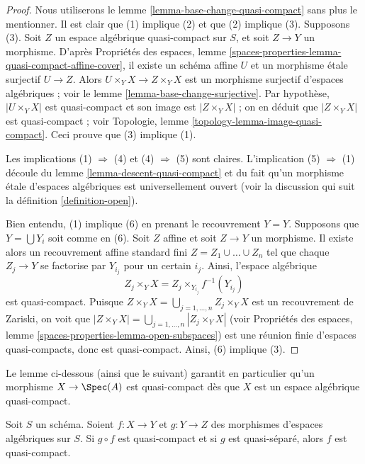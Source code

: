 \begin{proof}
Nous utiliserons le lemme \ref{lemma-base-change-quasi-compact}
sans plus le mentionner.
Il est clair que (1) implique (2) et que (2) implique (3).
Supposons (3). Soit $Z$ un espace algébrique quasi-compact sur $S$,
et soit $Z \to Y$ un morphisme. D'après
Propriétés des espaces, lemme
\ref{spaces-properties-lemma-quasi-compact-affine-cover},
il existe un schéma affine $U$ et un morphisme \'etale surjectif
$U \to Z$. Alors $U \times_Y X \to Z \times_Y X$ est un morphisme
surjectif d'espaces algébriques ; voir le
lemme \ref{lemma-base-change-surjective}.
Par hypothèse, $|U \times_Y X|$ est quasi-compact et son image
est $|Z \times_Y X|$ ; on en déduit que $|Z \times_Y X|$
est quasi-compact ; voir
Topologie, lemme \ref{topology-lemma-image-quasi-compact}.
Ceci prouve que (3) implique (1).

\medskip\noindent
Les implications (1) $\Rightarrow$ (4) et (4) $\Rightarrow$ (5) sont claires.
L'implication (5) $\Rightarrow$ (1) découle du
lemme \ref{lemma-descent-quasi-compact}
et du fait qu'un morphisme \'etale d'espaces algébriques est universellement ouvert
(voir la discussion qui suit la
définition \ref{definition-open}).

\medskip\noindent
Bien entendu, (1) implique (6) en prenant le recouvrement $Y = Y$.
Supposons que $Y = \bigcup Y_i$ soit comme en (6). Soit $Z$ affine et soit
$Z \to Y$ un morphisme. Il existe alors un recouvrement affine standard fini
$Z = Z_1 \cup \ldots \cup Z_n$ tel que chaque $Z_j \to Y$
se factorise par $Y_{i_j}$ pour un certain $i_j$. Ainsi, l'espace algébrique
$$
Z_j \times_Y X = Z_j \times_{Y_{i_j}} f^{-1}(Y_{i_j})
$$
est quasi-compact. Puisque
$Z \times_Y X = \bigcup_{j = 1, \ldots, n} Z_j \times_Y X$
est un recouvrement de Zariski, on voit que
$|Z \times_Y X| = \bigcup_{j = 1, \ldots, n} |Z_j \times_Y X|$
(voir Propriétés des espaces, lemme \ref{spaces-properties-lemma-open-subspaces})
est une réunion finie d'espaces quasi-compacts, donc est quasi-compact.
Ainsi, (6) implique (3).
\end{proof}

\noindent
Le lemme ci-dessous (ainsi que le suivant) garantit en particulier qu'un morphisme
$X \to \Spec(A)$ est quasi-compact dès que
$X$ est un espace algébrique quasi-compact.

\begin{lemma}
\label{lemma-quasi-compact-permanence}
Soit $S$ un schéma.
Soient $f : X \to Y$ et $g : Y \to Z$ des morphismes d'espaces algébriques sur $S$.
Si $g \circ f$ est quasi-compact et si $g$ est quasi-séparé,
alors $f$ est quasi-compact.
\end{lemma}

